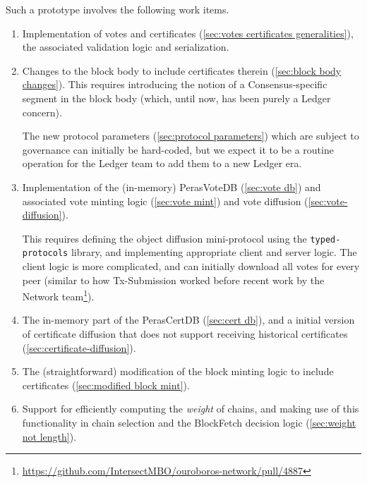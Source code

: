Such a prototype involves the following work items.
\begin{enumerate}
\item\label{enumi:proto no certs:1}
  Implementation of votes and certificates (\cref{sec:votes certificates generalities}), the associated validation logic and serialization.
\item\label{enumi:proto no certs:2}
  Changes to the block body to include certificates therein (\cref{sec:block body changes}).
  This requires introducing the notion of a Consensus-specific segment in the block body (which, until now, has been purely a Ledger concern).

  The new protocol parameters (\cref{sec:protocol parameters}) which are subject to governance can initially be hard-coded, but we expect it to be a routine operation for the Ledger team to add them to a new Ledger era.
\item\label{enumi:proto no certs:3}
  Implementation of the (in-memory) PerasVoteDB (\cref{sec:vote db}) and associated vote minting logic (\cref{sec:vote mint}) and vote diffusion (\cref{sec:vote-diffusion}).

  This requires defining the object diffusion mini-protocol using the \texttt{typed-protocols} library, and implementing appropriate client and server logic.
  The client logic is more complicated, and can initially download all votes for every peer (similar to how Tx-Submission worked before recent work by the Network team\footnote{\url{https://github.com/IntersectMBO/ouroboros-network/pull/4887}}).
\item\label{enumi:proto no certs:4}
  The in-memory part of the PerasCertDB (\cref{sec:cert db}), and a initial version of certificate diffusion that does not support receiving historical certificates (\cref{sec:certificate-diffusion}).
\item\label{enumi:proto no certs:5}
  The (straightforward) modification of the block minting logic to include certificates (\cref{sec:modified block mint}).
\item\label{enumi:proto no certs:6}
  Support for efficiently computing the \emph{weight} of chains, and making use of this functionality in chain selection and the BlockFetch decision logic (\cref{sec:weight not length}).
\end{enumerate}

